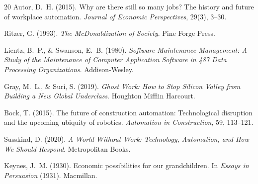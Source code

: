 \documentclass[12pt,a4paper]{article}
\theoremstyle{plain}
\theoremstyle{definition}
\theoremstyle{remark}
\begin{document}
\begin{thebibliography}{20}
Autor, D.~H. (2015).
Why are there still so many jobs? The history and future of workplace automation.
\textit{Journal of Economic Perspectives}, 29(3), 3--30.

Ritzer, G. (1993).
\textit{The McDonaldization of Society}.
Pine Forge Press.

Lientz, B.~P., \& Swanson, E.~B. (1980).
\textit{Software Maintenance Management: A Study of the Maintenance of Computer
Application Software in 487 Data Processing Organizations}.
Addison-Wesley.

Gray, M.~L., \& Suri, S. (2019).
\textit{Ghost Work: How to Stop Silicon Valley from Building a New Global
Underclass}.
Houghton Mifflin Harcourt.

Bock, T. (2015).
The future of construction automation: Technological disruption and the
upcoming ubiquity of robotics.
\textit{Automation in Construction}, 59, 113--121.

Susskind, D. (2020).
\textit{A World Without Work: Technology, Automation, and How We Should
Respond}.
Metropolitan Books.

Keynes, J.~M. (1930).
Economic possibilities for our grandchildren.
In \textit{Essays in Persuasion} (1931).
Macmillan.

\end{thebibliography}
\end{document}
